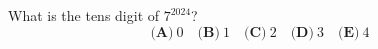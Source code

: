 What is the tens digit of $7^{2024}$?
\[\textbf{(A)}~0\quad\textbf{(B)}~1\quad\textbf{(C)}~2\quad\textbf{(D)}~3\quad\textbf{(E)}~4\]
